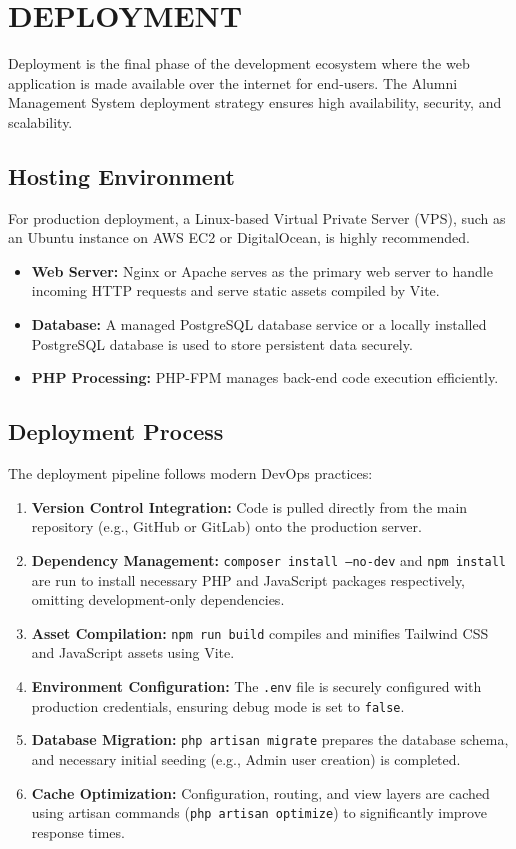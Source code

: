 \chapter{DEPLOYMENT}

Deployment is the final phase of the development ecosystem where the web application is made available over the internet for end-users. The Alumni Management System deployment strategy ensures high availability, security, and scalability.

\section{Hosting Environment}
For production deployment, a Linux-based Virtual Private Server (VPS), such as an Ubuntu instance on AWS EC2 or DigitalOcean, is highly recommended. 
\begin{itemize}
    \item \textbf{Web Server:} Nginx or Apache serves as the primary web server to handle incoming HTTP requests and serve static assets compiled by Vite.
    \item \textbf{Database:} A managed PostgreSQL database service or a locally installed PostgreSQL database is used to store persistent data securely.
    \item \textbf{PHP Processing:} PHP-FPM manages back-end code execution efficiently.
\end{itemize}

\section{Deployment Process}
The deployment pipeline follows modern DevOps practices:
\begin{enumerate}
    \item \textbf{Version Control Integration:} Code is pulled directly from the main repository (e.g., GitHub or GitLab) onto the production server.
    \item \textbf{Dependency Management:} \texttt{composer install --no-dev} and \texttt{npm install} are run to install necessary PHP and JavaScript packages respectively, omitting development-only dependencies.
    \item \textbf{Asset Compilation:} \texttt{npm run build} compiles and minifies Tailwind CSS and JavaScript assets using Vite.
    \item \textbf{Environment Configuration:} The \texttt{.env} file is securely configured with production credentials, ensuring debug mode is set to \texttt{false}.
    \item \textbf{Database Migration:} \texttt{php artisan migrate} prepares the database schema, and necessary initial seeding (e.g., Admin user creation) is completed.
    \item \textbf{Cache Optimization:} Configuration, routing, and view layers are cached using artisan commands (\texttt{php artisan optimize}) to significantly improve response times.
\end{enumerate}


